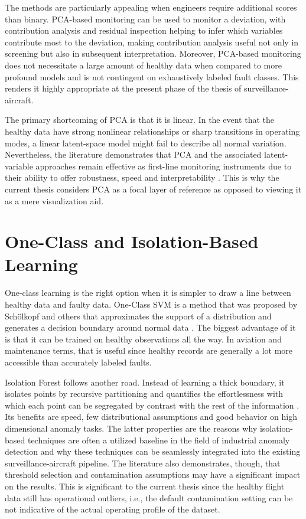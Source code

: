 \documentclass[12pt,a4paper]{report}
\begin{document}
	The methods are particularly appealing when engineers require additional scores than binary. PCA-based monitoring can be used to monitor a deviation, with contribution analysis and residual inspection helping to infer which variables contribute most to the deviation, making contribution analysis useful not only in screening but also in subsequent interpretation. Moreover, PCA-based monitoring does not necessitate a large amount of healthy data when compared to more profound models and is not contingent on exhaustively labeled fault classes. This renders it highly appropriate at the present phase of the thesis of surveillance-aircraft.
	
	The primary shortcoming of PCA is that it is linear. In the event that the healthy data have strong nonlinear relationships or sharp transitions in operating modes, a linear latent-space model might fail to describe all normal variation. Nevertheless, the literature demonstrates that PCA and the associated latent-variable approaches remain effective as first-line monitoring instruments due to their ability to offer robustness, speed and interpretability \cite{macgregor1994overview,westerhuis2000contrib}. This is why the current thesis considers PCA as a focal layer of reference as opposed to viewing it as a mere visualization aid.
	
	\section{One-Class and Isolation-Based Learning}
	
	One-class learning is the right option when it is simpler to draw a line between healthy data and faulty data. One-Class SVM is a method that was proposed by Schölkopf and others that approximates the support of a distribution and generates a decision boundary around normal data \cite{scholkopf2001ocsvm}. The biggest advantage of it is that it can be trained on healthy observations all the way. In aviation and maintenance terms, that is useful since healthy records are generally a lot more accessible than accurately labeled faults.
	
	Isolation Forest follows another road. Instead of learning a thick boundary, it isolates points by recursive partitioning and quantifies the effortlessness with which each point can be segregated by contrast with the rest of the information \cite{liu2008iforest, liu2012iforest}. Its benefits are speed, few distributional assumptions and good behavior on high dimensional anomaly tasks. The latter properties are the reasons why isolation-based techniques are often a utilized baseline in the field of industrial anomaly detection and why these techniques can be seamlessly integrated into the existing surveillance-aircraft pipeline. The literature also demonstrates, though, that threshold selection and contamination assumptions may have a significant impact on the results. This is significant to the current thesis since the healthy flight data still has operational outliers, i.e., the default contamination setting can be not indicative of the actual operating profile of the dataset.
	
\end{document}
